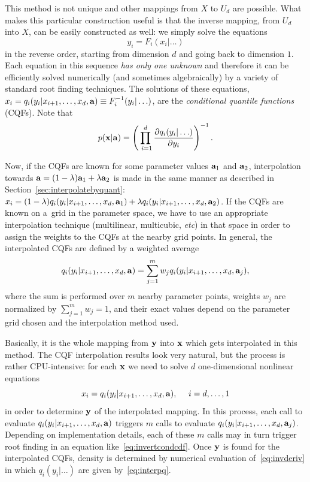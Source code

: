 \documentclass[12pt,titlepage]{article}
\begin{document}
This method is not unique and other mappings 
from $X$ to $U_d$ are possible. What makes this particular construction useful
is that the inverse mapping, from $U_d$ into $X$, can be
easily constructed as well: we simply solve the equations 
\begin{equation}
\label{eq:invertcondcdf}
y_i = F_i(x_i | \ldots)
\end{equation}
in the reverse order, starting from dimension $d$ and going back
to dimension $1$. Each equation in this sequence {\it has only one unknown}
and therefore it can be efficiently solved numerically
(and sometimes algebraically) by a variety
of standard root finding techniques. The solutions of these equations,
$x_i = q_i(y_i | x_{i+1}, \ldots, x_d, {\bf a}) \equiv F_i^{-1}(y_i | \ldots)$, are
the {\it conditional quantile functions} (CQFs). Note that
\begin{equation}
\label{eq:invderiv}
p({\bf x}|{\bf a}) = \left( \prod_{\ i=1}^{d}{\frac{\partial q_i(y_i | \ldots)}{\partial y_i}} \right)^{-1}.
\end{equation}

Now, if the CQFs are known for some parameter values
${\bf a}_1$ and ${\bf a}_2$,
interpolation towards ${\bf a} = (1 - \lambda) {\bf a}_1 + \lambda {\bf a}_2$ is made
in the same manner as described in Section~\ref{sec:interpolatebyquant}: 
$x_i = (1 - \lambda) q_i(y_i | x_{i+1}, \ldots, x_d, {\bf a}_1) + \lambda q_i(y_i | x_{i+1}, \ldots, x_d, {\bf a}_2)$.
If the CQFs 
are known on a~grid in the parameter space, we have to use
an appropriate interpolation technique (multilinear, multicubic, {\it etc})
in that space in order to assign
the weights to the CQFs at the nearby grid points. In general,
the interpolated CQFs are defined by
a weighted average
\begin{equation}
\label{eq:interpq}
q_i(y_i | x_{i+1}, \ldots, x_d, {\bf a}) = \sum_{j=1}^m w_j q_i(y_i | x_{i+1}, \ldots, x_d, {\bf a}_j),
\end{equation}
where the sum is performed over $m$ nearby parameter points,
weights $w_j$ are normalized by $\sum_{j=1}^m w_j = 1$, and their
exact values depend on the parameter grid chosen and the interpolation method
used.

Basically, it is the whole mapping from ${\bf y}$ into ${\bf x}$ which gets
interpolated in this method.
The CQF interpolation results look 
very natural, but the process is rather CPU-intensive:
for each ${\bf x}$ we need to solve $d$ one-dimensional nonlinear equations
\begin{equation}
\label{eq:interpsolve}
x_i = q_i(y_i | x_{i+1}, \ldots, x_d, {\bf a}), \ \ \ \ i = d, \ldots, 1
\end{equation}
in order to determine ${\bf y}$ of the interpolated mapping.
In this process, each call to evaluate $q_i(y_i | x_{i+1}, \ldots, x_d, {\bf a})$
triggers $m$ calls to evaluate $q_i(y_i | x_{i+1}, \ldots, x_d, {\bf a}_j)$.
Depending on implementation details, each of these $m$ calls
may in turn trigger root finding in an equation
like~\ref{eq:invertcondcdf}.
Once ${\bf y}$ is found for the interpolated CQFs,
density is determined by numerical
evaluation of~\ref{eq:invderiv}
in which $q_i(y_i | \ldots)$ are given by~\ref{eq:interpq}.
\end{document}
